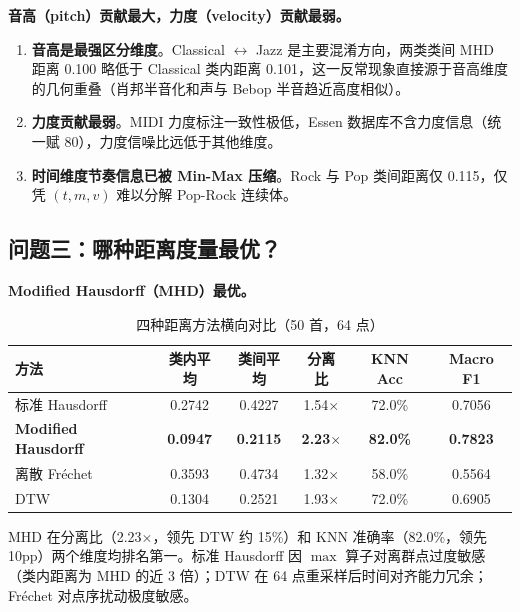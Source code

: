 \documentclass[withoutpreface]{cumcmthesis}
\begin{document}
\textbf{音高（pitch）贡献最大，力度（velocity）贡献最弱。}

\begin{enumerate}[label=(\arabic*),leftmargin=2em]
    \item \textbf{音高是最强区分维度}。Classical $\leftrightarrow$ Jazz 是主要混淆方向，两类类间 MHD 距离 0.100 略低于 Classical 类内距离 0.101，这一反常现象直接源于音高维度的几何重叠（肖邦半音化和声与 Bebop 半音趋近高度相似）。
    \item \textbf{力度贡献最弱}。MIDI 力度标注一致性极低，Essen 数据库不含力度信息（统一赋 80），力度信噪比远低于其他维度。
    \item \textbf{时间维度节奏信息已被 Min-Max 压缩}。Rock 与 Pop 类间距离仅 0.115，仅凭 $(t, m, v)$ 难以分解 Pop-Rock 连续体。
\end{enumerate}

\subsection{问题三：哪种距离度量最优？}

\textbf{Modified Hausdorff（MHD）最优。}

\begin{table}[htbp]
    \centering
    \caption{四种距离方法横向对比（50 首，64 点）}
    \label{tab:method_compare}
    \begin{tabular}{lccccc}
        \toprule
        \textbf{方法} & \textbf{类内平均} & \textbf{类间平均} & \textbf{分离比} & \textbf{KNN Acc} & \textbf{Macro F1} \\
        \midrule
        标准 Hausdorff & 0.2742 & 0.4227 & 1.54$\times$ & 72.0\% & 0.7056 \\
        \textbf{Modified Hausdorff} & \textbf{0.0947} & \textbf{0.2115} & \textbf{2.23$\times$} & \textbf{82.0\%} & \textbf{0.7823} \\
        离散 Fr\'{e}chet & 0.3593 & 0.4734 & 1.32$\times$ & 58.0\% & 0.5564 \\
        DTW & 0.1304 & 0.2521 & 1.93$\times$ & 72.0\% & 0.6905 \\
        \bottomrule
    \end{tabular}
\end{table}

MHD 在分离比（2.23$\times$，领先 DTW 约 15\%）和 KNN 准确率（82.0\%，领先 10pp）两个维度均排名第一。标准 Hausdorff 因 $\max$ 算子对离群点过度敏感（类内距离为 MHD 的近 3 倍）；DTW 在 64 点重采样后时间对齐能力冗余；Fr\'{e}chet 对点序扰动极度敏感。
\end{document}
